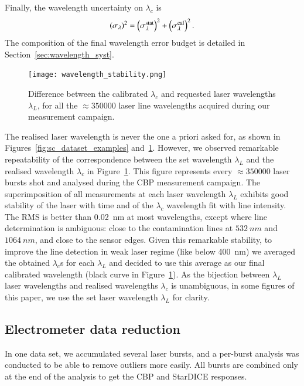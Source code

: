 Finally, the wavelength uncertainty on $\lambda_c$ is
\begin{equation}
  \left(\sigma_{\lambda}\right)^2 =  \left(\sigma_{\lambda}^{\rm stat}\right)^2 +  \left(\sigma_{\lambda}^{\rm cal}\right)^2.   
\end{equation}
The composition of the final wavelength error budget is detailed in Section~\ref{sec:wavelength_syst}.


\begin{figure}[!h]
\centering
\texttt{[image: wavelength\_stability.png]}
\caption{Difference between the calibrated $\lambda_c$ and requested laser wavelengths $\lambda_L$, for all the $\approx \num{350000}$ laser line wavelengths acquired during our measurement campaign.}\label{fig:wavelength_stability}
\end{figure}


The realised laser wavelength is never the one a priori asked for, as shown in Figures~\ref{fig:sc_dataset_examples} and~\ref{fig:wavelength_stability}. However, we observed remarkable repeatability of the correspondence between the set wavelength $\lambda_L$ and the realised wavelength $\lambda_c$ in Figure~\ref{fig:wavelength_stability}. This figure represents every $\approx\num{350000}$ laser bursts shot and analysed during the CBP measurement campaign. The superimposition of all measurements at each laser wavelength $\lambda_L$ exhibits good stability of the laser with time and of the $\lambda_c$ wavelength fit with line intensity. The RMS is better than \SI{0.02}{\nm} at most wavelengths, except where line determination is ambiguous: close to the contamination lines at $\SI{532}{nm}$ and $\SI{1064}{nm}$, and close to the sensor edges. Given this remarkable stability, to improve the line detection in weak laser regime (like below \SI{400}{\nm}) we averaged the obtained $\lambda_c$s for each $\lambda_L$ and decided to use this average as our final calibrated wavelength (black curve in Figure~\ref{fig:wavelength_stability}). As the bijection between $\lambda_L$ laser wavelengths and realised wavelengths $\lambda_c$ is unambiguous, in some figures of this paper, we use the set laser wavelength $\lambda_L$ for clarity. 



\subsection{Electrometer data reduction}

In one data set, we accumulated several laser bursts, and a per-burst analysis was conducted to be able to remove outliers more easily. All bursts are combined only at the end of the analysis to get the CBP and StarDICE responses.


